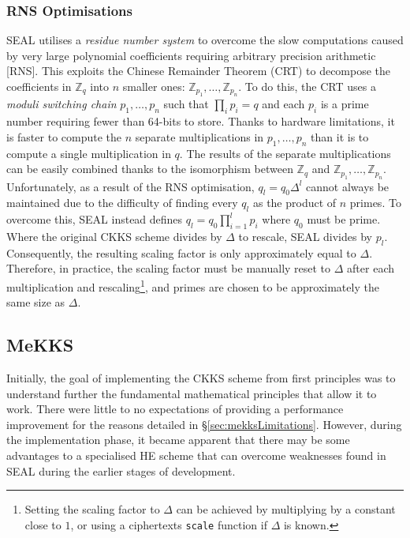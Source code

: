 \setlength{\leftskip}{0cm}
\subsubsection{RNS Optimisations}
\setlength{\leftskip}{0.5cm}
\indent \indent
SEAL utilises a \textit{residue number system} \cite{RNS} to overcome the slow computations caused by very large polynomial coefficients requiring arbitrary precision arithmetic [RNS]. This exploits the Chinese Remainder Theorem (CRT) to decompose the coefficients in $\mathbb{Z}_q$ into $n$ smaller ones: $\mathbb{Z}_{p_1}, \ldots, \mathbb{Z}_{p_n}$. To do this, the CRT uses a \textit{moduli switching chain} $p_1, \ldots, p_n$ such that $\prod_i p_i = q$ and each $p_i$ is a prime number requiring fewer than 64-bits to store. Thanks to hardware limitations, it is faster to compute the $n$ separate multiplications in $p_1, \ldots, p_n$ than it is to compute a single multiplication in $q$. The results of the separate multiplications can be easily combined thanks to the isomorphism between $\mathbb{Z}_q$ and $\mathbb{Z}_{p_1}, \ldots, \mathbb{Z}_{p_n}$.
\smallskip \\ \indent
Unfortunately, as a result of the RNS optimisation, $q_l = q_0 \Delta^l$ cannot always be maintained due to the difficulty of finding every $q_l$ as the product of $n$ primes. To overcome this, SEAL instead defines $q_l = q_0 \prod_{i=1}^l p_i$ where $q_0$ must be prime. Where the original CKKS scheme divides by $\Delta$ to rescale, SEAL divides by $p_l$. Consequently, the resulting scaling factor is only approximately equal to $\Delta$. Therefore, in practice, the scaling factor must be manually reset to $\Delta$ after each multiplication and rescaling\footnote{Setting the scaling factor to $\Delta$ can be achieved by multiplying by a constant close to $1$, or using a ciphertexts \texttt{scale} function if $\Delta$ is known.}, and primes are chosen to be approximately the same size as $\Delta$.

\setlength{\leftskip}{0cm}

\subsection{MeKKS}
\setlength{\leftskip}{0.5cm}
\indent \indent
Initially, the goal of implementing the CKKS scheme from first principles was to understand further the fundamental mathematical principles that allow it to work. There were little to no expectations of providing a performance improvement for the reasons detailed in §\ref{sec:mekksLimitations}. However, during the implementation phase, it became apparent that there may be some advantages to a specialised HE scheme that can overcome weaknesses found in SEAL during the earlier stages of development.

